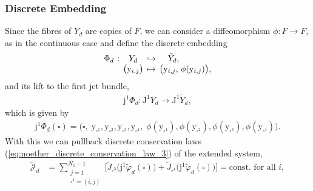 \documentclass[12pt,a4paper,reqno]{article}
\begin{document}
\subsubsection*{Discrete Embedding}

Since the fibres of $Y_{d}$ are copies of $F$, we can consider a diffeomorphism $\phi : F \rightarrow F$, as in the continuous case and define the discrete embedding
\begin{align}\label{eq:formal_lagrangians_embedding_discrete}
\arraycolsep=2pt
\begin{array}{rcccl}
\Phi_{d} & : & Y_{d} & \hookrightarrow & \quad \tilde{Y}_{d} , \\
& & \big( {\ensuremath{{\ensuremath{\mathrm{{y}}}}}}_{i,j} \big) & \mapsto & \big( {\ensuremath{{\ensuremath{\mathrm{{y}}}}}}_{i,j}, \, \phi ({\ensuremath{{\ensuremath{\mathrm{{y}}}}}}_{i,j}) \big) ,
\end{array}
\end{align}
and its lift to the first jet bundle,
\begin{align}
{\ensuremath{\mathrm{j}}}^{1} \Phi_{d} : {\ensuremath{\mathrm{J}}}^{1} Y_{d} \rightarrow {\ensuremath{\mathrm{J}}}^{1} \tilde{Y}_{d},
\end{align}
which is given by
\begin{align}
{\ensuremath{\mathrm{j}}}^{1} \Phi_{d} (\square) = \big( \square, \; {\ensuremath{{\ensuremath{\mathrm{{y}}}}}}_{\square^{1}}, {\ensuremath{{\ensuremath{\mathrm{{y}}}}}}_{\square^{2}}, {\ensuremath{{\ensuremath{\mathrm{{y}}}}}}_{\square^{3}}, {\ensuremath{{\ensuremath{\mathrm{{y}}}}}}_{\square^{4}}, \; \phi( {\ensuremath{{\ensuremath{\mathrm{{y}}}}}}_{\square^{1}} ), \phi( {\ensuremath{{\ensuremath{\mathrm{{y}}}}}}_{\square^{2}} ), \phi( {\ensuremath{{\ensuremath{\mathrm{{y}}}}}}_{\square^{3}} ), \phi( {\ensuremath{{\ensuremath{\mathrm{{y}}}}}}_{\square^{4}} ) \big) .
\end{align}
With this we can pullback discrete conservation laws (\ref{eq:noether_discrete_conservation_law_3}) of the extended system,
\begin{align}\label{eq:formal_lagrangians_discrete_noether_charge_extended}
\tilde{\mathcal{J}}_{d} &= \sum \limits_{\substack{j=1\\ \square^{1} = (i,j)}}^{N_{1}-1} \Big[ \tilde{J}_{\square^{3}} \big( {\ensuremath{\mathrm{j}}}^{1} \tilde{\ensuremath{\varphi}}_{d} (\square) \big) + \tilde{J}_{\square^{4}} \big( {\ensuremath{\mathrm{j}}}^{1} \tilde{\ensuremath{\varphi}}_{d} (\square) \big) \Big] = \text{const. for all $i$} ,
\end{align}
\end{document}
